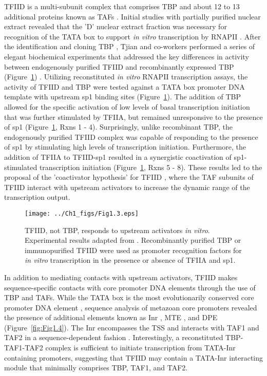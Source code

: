 TFIID is a multi-subunit complex that comprises TBP and about 12 to 13 additional proteins known as TAFs \cite{Burley_3049}. Initial studies with partially purified nuclear extract revealed that the 'D' nuclear extract fraction was necessary for recognition of the TATA box to support \emph{in vitro} transcription by RNAPII \cite{Matsui_3980}. After the identification and cloning TBP \cite{Buratowski_1988}, Tjian and co-workers performed a series of elegant biochemical experiments that addressed the key differences in activity between endogenously purified TFIID and recombinantly expressed TBP  (Figure~\ref{fig:Fig1.3})  \cite{Dynlacht_3551,Pugh_3586}. Utilizing reconstituted \emph{in vitro} RNAPII transcription assays, the activity of TFIID and TBP were tested against a TATA box promoter DNA template with upstream sp1 binding sites (Figure~\ref{fig:Fig1.3}). The addition of TBP allowed for the specific activation of low levels of basal transcription initiation that was further stimulated by TFIIA, but remained unresponsive to the presence of sp1 (Figure~\ref{fig:Fig1.3}, Rxns 1 - 4). Surprisingly, unlike recombinant TBP, the endogenously purified TFIID complex was capable of responding to the presence of sp1 by stimulating high levels of transcription initiation.  Furthermore, the addition of TFIIA to TFIID-sp1 resulted in a synergistic coactivation of sp1-stimulated transcription initiation (Figure~\ref{fig:Fig1.3}, Rxns 5 - 8). These results led to the proposal of the 'coactivator hypothesis' for TFIID \cite{Pugh_3586}, where the TAF subunits of TFIID interact with upstream activators to increase the dynamic range of the transcription output. \\
\begin{figure}
\centering
\texttt{[image: ../Ch1\_figs/Fig1.3.eps]}
\caption[TFIID, not TBP, responds to upstream activators \emph{in vitro}]{TFIID, not TBP, responds to upstream activators \emph{in vitro}. Experimental results adapted from \cite{Dynlacht_3551,Pugh_3586}. Recombinantly purified TBP or immunopurified TFIID were used as promoter recognition factors for \emph{in vitro} transcription in the presence or absence of TFIIA and sp1.} 
\label{fig:Fig1.3}
\end{figure}
\indent In addition to mediating contacts with upstream activators, TFIID makes sequence-specific contacts with core promoter DNA elements through the use of TBP and TAFs. While the TATA box is the most evolutionarily conserved core promoter DNA element \cite{Goldberg_1979}, sequence analysis of metazoan core promoters revealed the presence of additional elements known as Inr \cite{Smale_3697}, MTE \cite{Lim_1522}, and DPE \cite{Burke_3081} (Figure~\ref{fig:Fig1.4}). The Inr encompasses the TSS and interacts with TAF1 and TAF2 in a sequence-dependent fashion \cite{Chalkley_2339,Verrijzer_3120}. Interestingly, a reconstituted TBP-TAF1-TAF2 complex is sufficient to initiate transcription from TATA-Inr containing promoters, suggesting that TFIID may contain a TATA-Inr interacting module that minimally comprises TBP, TAF1, and TAF2. \\
